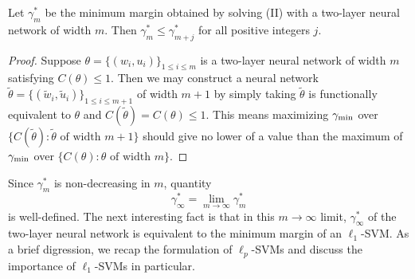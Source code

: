 \begin{theorem}
Let $\gamma_m^*$ be the minimum margin obtained by solving (II) with a two-layer neural network of width $m$. Then $\gamma_m^* \leq \gamma_{m+j}^*$ for all positive integers $j$.
\end{theorem}

\begin{proof}
Suppose $\theta = \{(w_i, u_i)\}_{1 \leq i \leq m}$ is a two-layer neural network of width $m$ satisfying $C(\theta)\le 1$. Then we may construct a neural network $\widetilde \theta = \{(\tilde w_i, \tilde u_i)\}_{1 \leq i \leq m+1}$ of width $m+1$ by simply taking
$\widetilde \theta$ is functionally equivalent to $\theta$ and $C(\widetilde \theta) = C(\theta) \le 1$. This means maximizing $\gamma_{\mathrm{min}}$ over $\{C(\widetilde \theta): \widetilde \theta\text{ of width }m+1\}$ should give no lower of a value than the maximum of $\gamma_{\mathrm{min}}$ over $\{C(\theta): \theta\text{ of width }m\}$.
\end{proof}


Since $\gamma_m^*$ is non-decreasing in $m$, quantity 
\begin{equation}
\gamma_\infty ^* = \lim_{m\to \infty } \gamma_m^*
\end{equation}
is well-defined. The next interesting fact is that in this $m \to \infty$ limit, $\gamma_{\infty}^*$ of the two-layer neural network is equivalent to the minimum margin of an $\ell_1$-SVM. As a brief digression, we recap the formulation of $\ell_p$-SVMs and discuss the importance of $\ell_1$-SVMs in particular.

